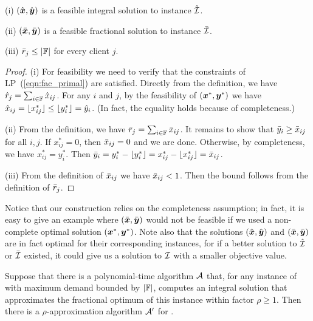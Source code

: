 \documentclass[11pt]{article}
\begin{document}

\begin{lemma}\label{lem: polynomial demands partition}
{\rm (i)}
  $(\hat{\boldsymbol{x}}, \hat{\boldsymbol{y}})$ is a feasible integral solution to
  instance ${\hat{\cal I}}$.

\noindent
{\rm (ii)}
  $(\bar{\boldsymbol{x}}, \bar{\boldsymbol{y}})$ is a feasible fractional
  solution to instance ${\bar{\cal I}}$.

\noindent
{\rm (iii)}
${\bar r}_j\leq |\mathbb{F}|$ for every client $j$.

\end{lemma}

\begin{proof}
(i) For feasibility we need to verify that the constraints of LP~(\ref{eqn:fac_primal})
are satisfied. Directly from the definition, we have ${\hat r}_j = \sum_{i\in\mathbb{F}} {\hat x}_{ij}$.
For any $i$ and $j$, by the feasibility of $(\boldsymbol{x}^\ast,\boldsymbol{y}^\ast)$ we have
${\hat x}_{ij} = { \lfloor x_{ij}^\ast \rfloor } \le { \lfloor y^\ast_i \rfloor } = {\hat y}_i$. (In fact, the equality
holds because of completeness.)

(ii) From the definition, we have  ${\bar r}_j = \sum_{i\in\mathbb{F}} {\bar x}_{ij}$.
It remains to show that ${\bar y}_i \geq \bar x_{ij}$ for all $i,j$. 
If $x_{ij}^\ast=0$, then ${\bar x}_{ij}=0$ and we are done. 
Otherwise, by completeness, we have $x_{ij}^\ast=y_i^\ast$. 
Then  ${\bar y}_i = y_i^\ast - { \lfloor y_i^\ast \rfloor } = x_{ij}^\ast - { \lfloor x_{ij}^\ast \rfloor } ={\bar x}_{ij}$. 

(iii) From the definition of ${\bar x}_{ij}$ we have
  ${\bar x}_{ij} < 1$.  Then the bound follows from the definition of ${\bar r}_j$.
\end{proof}

Notice that our construction relies on the completeness assumption; in fact, it is
easy to give an example where $(\bar{\boldsymbol{x}}, \bar{\boldsymbol{y}})$ would not be feasible if we
used a non-complete optimal solution $(\boldsymbol{x}^\ast,\boldsymbol{y}^\ast)$.
Note also that the solutions $(\hat{\boldsymbol{x}},\hat{\boldsymbol{y}})$ and $(\bar{\boldsymbol{x}}, \bar{\boldsymbol{y}})$ are in fact
optimal for their corresponding instances, for if a better solution to ${\hat{\cal I}}$ or
${\bar{\cal I}}$ existed, it could
give us a solution to $\mathcal{I}$ with a smaller objective value.


\begin{theorem}\label{thm: reduction to polynomial}
  Suppose that there is a polynomial-time algorithm ${\cal A}$
  that, for any instance of {\FTFP} with maximum demand
  bounded by $|\mathbb{F}|$, computes an integral solution
  that approximates the fractional optimum of this instance
  within factor $\rho\geq 1$.  Then there is a
  $\rho$-approximation algorithm ${\cal A}'$ for {\FTFP}.
\end{theorem}
\end{document}
